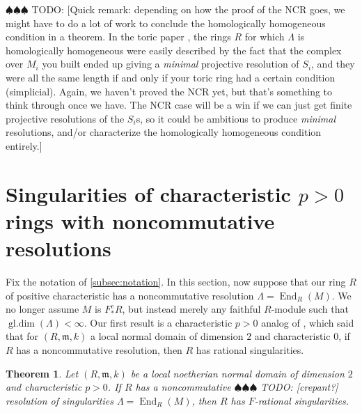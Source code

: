 \documentclass{amsart}
\newtheorem{thm}{Theorem}[section]
\theoremstyle{definition}
\def\fm{\mathfrak{m}}
\DeclareMathOperator{\gldim}{\operatorname{gl.dim}}
\DeclareMathOperator{\End}{\operatorname{End}}
\newcommand{\Fe}{F_{*}^{e}}
\newcommand{\todo}[1]{{\color{teal} \sf $\spadesuit\spadesuit\spadesuit$ TODO: [#1]}}
\begin{document}
\todo{Quick remark: depending on how the proof of the NCR goes, we might have to do a lot of work to conclude the homologically homogeneous condition in a theorem. In the toric paper \cite{FMS19},  the rings $R$ for which $\Lambda$ is homologically homogeneous were easily described by the fact that the complex over $M_{i}$ you built ended up giving a \emph{minimal} projective resolution of $S_{i}$, and they were all the same length if and only if your toric ring had a certain condition (simplicial). Again, we haven't proved the NCR yet, but that's something to think through once we have. The NCR case will be a win if we can just get finite projective resolutions of the $S_{i}$s, so it could be ambitious to produce \emph{minimal} resolutions, and/or characterize the homologically homogeneous condition entirely.}

\section{Singularities of characteristic \texorpdfstring{$p>0$}{p>0} rings with noncommutative resolutions}\label{sec:sings_of_NCR_rings}

Fix the notation of \cref{subsec:notation}. In this section, now suppose that our ring $R$ of positive characteristic has a noncommutative resolution $\Lambda=\End_{R}(M)$. We no longer assume $M$ is $\Fe R$, but instead merely any faithful $R$-module such that $\gldim(\Lambda)<\infty$. Our first result is a characteristic $p>0$ analog of \cite[Cor.\ ~3.3]{DITV15}, which said that for $(R,\fm,k)$ a local normal domain of dimension $2$ and characteristic $0$, if $R$ has a noncommutative resolution, then $R$ has rational singularities.

\bigbreak

\begin{thm}\label{thm:NCR_implies_Frat}
Let $(R,\fm,k)$ be a local noetherian normal domain of dimension $2$ and characteristic $p>0$. If $R$ has a noncommutative \todo{crepant?} resolution of singularities $\Lambda=\End_{R}(M)$, then $R$ has $F$-rational singularities.
\end{thm}

\bigbreak
\end{document}
